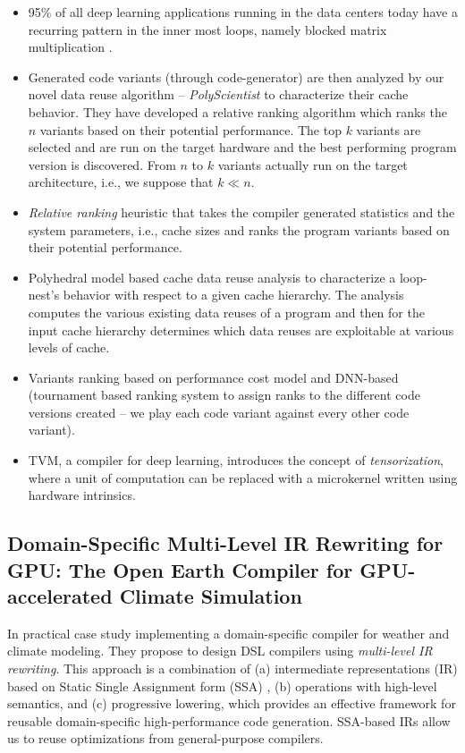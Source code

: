 \begin{itemize}
    \item 95\% of all deep learning applications running in the data centers today have a recurring pattern in the inner most loops, namely blocked matrix multiplication \cite{Georganas2019HighPerformanceDL, Hwang2017IndatacenterPA}.
    \item Generated code variants (through code-generator) are then analyzed by our novel data reuse algorithm – \textit{PolyScientist} to characterize their cache behavior. They have developed a relative ranking algorithm which ranks the $n$ variants based on their potential performance. The top $k$ variants are selected and are run on the target hardware and the best performing program version is discovered. From $n$ to $k$ variants actually run on the target architecture, i.e., we suppose that $k \ll n$.
    \item \textit{Relative ranking} heuristic that takes the compiler generated statistics and the system parameters, i.e., cache sizes and ranks the program variants based on their potential performance.
    \item Polyhedral model based cache data reuse analysis to characterize a loop-nest’s behavior with respect to a given cache hierarchy. The analysis computes the various existing data reuses of a program and then for the input cache hierarchy determines which data reuses are exploitable at various levels of cache.
    \item Variants ranking based on performance cost model and DNN-based (tournament based ranking system to assign ranks to the different code versions created – we play each code variant against every other code variant).
    \item TVM, a compiler for deep learning, introduces the concept of \textit{tensorization}, where a unit of computation can be replaced with a microkernel written using hardware intrinsics.
\end{itemize}

\subsection{Domain-Specific Multi-Level IR Rewriting for GPU: The Open Earth Compiler for GPU-accelerated Climate Simulation}
In \cite{gysi_domain-specific_2021} practical case study implementing a domain-specific compiler for weather and climate modeling. They propose to design DSL compilers using \textit{multi-level IR rewriting}. This approach is a combination of (a) intermediate representations (IR) based on Static Single Assignment form
(SSA) \cite{Rosen1988GlobalVN}, (b) operations with high-level semantics, and (c) progressive lowering, which provides an effective framework for reusable domain-specific high-performance code generation. SSA-based IRs allow us to reuse optimizations from general-purpose compilers.

